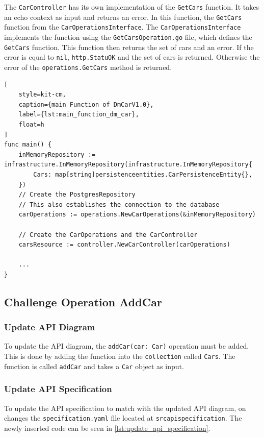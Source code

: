 The \texttt{CarController} has its own implementation of the \texttt{GetCars} function.
It takes an echo context as input and returns an error.
In this function, the \texttt{GetCars} function from the \texttt{CarOperationsInterface}.
The \texttt{CarOperationsInterface} implements the function using the \texttt{GetCarsOperation.go} file, which defines the \texttt{GetCars} function.
This function then returns the set of cars and an error.
If the error is equal to \texttt{nil}, \texttt{http.StatuOK} and the set of cars is returned.
Otherwise the error of the \texttt{operations.GetCars} method is returned.
\begin{lstlisting}[
    style=kit-cm,
    caption={main Function of DmCarV1.0},
    label={lst:main_function_dm_car},
    float=h
]
func main() {
    inMemoryRepository := infrastructure.InMemoryRepository(infrastructure.InMemoryRepository{
        Cars: map[string]persistenceentities.CarPersistenceEntity{},
    })
    // Create the PostgresRepository
    // This also establishes the connection to the database
    carOperations := operations.NewCarOperations(&inMemoryRepository)

    // Create the CarOperations and the CarController
    carsResource := controller.NewCarController(carOperations)

    ...
}
\end{lstlisting}


\subsection{Challenge Operation AddCar}
\subsubsection*{Update API Diagram}
To update the API diagram, the \texttt{addCar(car: Car)} operation must be added.
This is done by adding the function into the \texttt{collection} called \texttt{Cars}.
The function is called \texttt{addCar} and takes a \texttt{Car} object as input.

\subsubsection*{Update API Specification}
To update the API specification to match with the updated API diagram, on changes the \texttt{specification.yaml} file located at \texttt{src\/api\/specification\/}.
The newly inserted code can be seen in \autoref{lst:update_api_specification}.

